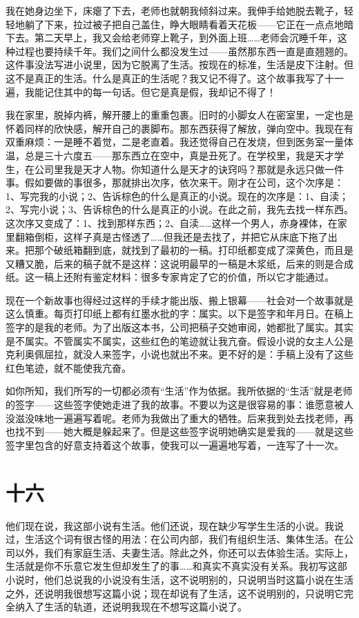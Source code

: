 我在她身边坐下，床瘪了下去，老师也就朝我倾斜过来。我伸手给她脱去靴子，轻轻地躺了下来，拉过被子把自己盖住，睁大眼睛看着天花板——它正在一点点地暗下去。第二天早上，我又会给老师穿上靴子，到外面上班……老师会沉睡千年，这种过程也要持续千年。我们之间什么都没发生过——虽然那东西一直是直翘翘的。这件事没法写进小说里，因为它脱离了生活。按现在的标准，生活是皮下注射。但这不是真正的生活。什么是真正的生活呢？我又记不得了。这个故事我写了十一遍，我能记住其中的每一句话。但它是真是假，我却记不得了！ 

我在家里，脱掉内裤，解开腰上的重重包裹。旧时的小脚女人在密室里，一定也是怀着同样的欣快感，解开自己的裹脚布。那东西获得了解放，弹向空中。我现在有双重麻烦：一是睡不着觉，二是老直着。我还觉得自己在发烧，但到医务室一量体温，总是三十六度五——那东西立在空中，真是丑死了。在学校里，我是天才学生，在公司里我是天才人物。你知道什么是天才的诀窍吗？那就是永远只做一件事。假如要做的事很多，那就排出次序，依次来干。刚才在公司，这个次序是：1、写完我的小说；2、告诉棕色的什么是真正的小说。现在的次序是：1、自渎；2、写完小说；3、告诉棕色的什么是真正的小说。在此之前，我先去找一样东西。这次序又变成了：1、找到那样东西；2、自渎……这样一个男人，赤身裸体，在家里翻箱倒柜，这样子真是古怪透了……但我还是去找了，并把它从床底下拖了出来。把那个破纸箱翻到底，就找到了最初的一稿。打印纸都变成了深黄色，而且是又糟又脆，后来的稿子就不是这样：这说明最早的一稿是木浆纸，后来的则是合成纸。这一稿上还附有鉴定材料：很多专家肯定了它的价值，所以它才能通过。 

现在一个新故事也得经过这样的手续才能出版、搬上银幕——社会对一个故事就是这么慎重。每页打印纸上都有红墨水批的字：属实。以下是签字和年月日。在稿上签字的是我的老师。为了出版这本书，公司把稿子交她审阅，她都批了属实。其实是不属实。不管属实不属实，这些红色的笔迹就让我亢奋。假设小说的女主人公是克利奥佩屈拉，就没人来签字，小说也就出不来。更不好的是：手稿上没有了这些红色笔迹，就不能使我亢奋。 

如你所知，我们所写的一切都必须有“生活”作为依据。我所依据的“生活”就是老师的签字——这些签字使她走进了我的故事。不要以为这是很容易的事：谁愿意被人没滋没味地一遍遍写着呢。老师为我做出了重大的牺牲。后来我到处去找老师，再也找不到——她大概是躲起来了。但是这些签字说明她确实是爱我的——就是这些签字里包含的好意支持着这个故事，使我可以一遍遍地写着，一连写了十一次。 
\section*{十六} 

他们现在说，我这部小说有生活。他们还说，现在缺少写学生生活的小说。我说过，生活这个词有很古怪的用法：在公司内部，我们有组织生活、集体生活。在公司以外，我们有家庭生活、夫妻生活。除此之外，你还可以去体验生活。实际上，生活就是你不乐意它发生但却发生了的事……和真实不真实没有关系。我初写这部小说时，他们总说我的小说没有生活，这不说明别的，只说明当时这篇小说在生活之外，还说明我很想写这篇小说；现在却说有了生活，这不说明别的，只说明它完全纳入了生活的轨道，还说明我现在不想写这篇小说了。 

